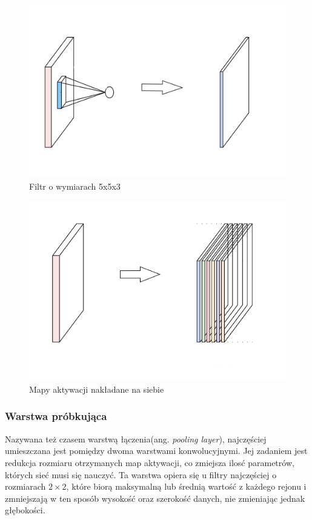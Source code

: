 \documentclass[a4paper,twoside,12pt]{book}
\newcommand{\obcy}[1]{\emph{#1}}
\newcommand{\ang}[1]{{\selectlanguage{british}\obcy{#1}}}
\begin{document}
{\begin{figure}[h!]
\centering
 \includegraphics[scale=0.20]{conv1.png}
  \caption{Filtr o wymiarach 5x5x3}
\label{conv1}
\end{figure}

\begin{figure}[h!]
  \centering
  \includegraphics[scale=0.7]{conv2.png}
  \caption{Mapy aktywacji nakładane na siebie}
  \label{conv2}

\end{figure}






\subsubsection{Warstwa próbkująca}
{Nazywana też czasem warstwą łączenia(ang. \ang {pooling layer}), najczęściej umieszczana jest pomiędzy dwoma warstwami konwolucyjnymi. Jej zadaniem jest redukcja rozmiaru otrzymanych map aktywacji, co zmiejsza ilosć parametrów, których sieć musi się nauczyć. Ta warstwa opiera się u filtry najczęściej o rozmiarach $2\times2$, które biorą maksymalną lub średnią wartość z każdego rejonu i zmniejszają w ten sposób wysokość oraz szerokość danych, nie zmieniając jednak głębokości.}


}
\end{document}

